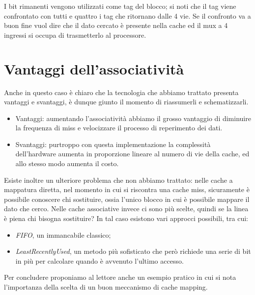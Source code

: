\documentclass[class=book, crop=false, oneside]{standalone}
\begin{document}
I bit rimanenti vengono utilizzati come tag del blocco; si noti che il tag viene confrontato con tutti e quattro i tag che ritornano dalle 4 vie.
Se il confronto va a buon fine vuol dire che il dato cercato è presente nella cache ed il mux a 4 ingressi si occupa di trasmetterlo al processore.

\section{Vantaggi dell'associatività}
Anche in questo caso è chiaro che la tecnologia che abbiamo trattato presenta vantaggi e svantaggi, è dunque giunto il momento di riassumerli e schematizzarli.
\begin{itemize}
	\item Vantaggi: aumentando l’associatività abbiamo il grosso vantaggio di diminuire la frequenza di miss e velocizzare il processo di reperimento dei dati.
	\item Svantaggi: purtroppo con questa implementazione la complessità dell'hardware aumenta in proporzione lineare al numero di vie della cache, ed allo stesso modo aumenta il costo.
\end{itemize}
Esiste inoltre un ulteriore problema che non abbiamo trattato: nelle cache a mappatura diretta, nel momento in cui si riscontra una cache miss, sicuramente è possibile conoscere chi sostituire, ossia l’unico blocco in cui è possibile mappare il dato che cerco. Nelle cache associative invece ci sono più scelte, quindi se la linea è piena chi bisogna sostituire? In tal caso esistono vari approcci possibili, tra cui:
\begin{itemize}
	\item \emph{FIFO}, un immancabile classico;
	\item \emph{LeastRecentlyUsed}, un metodo più sofisticato che però richiede una serie di bit in più per calcolare quando è avvenuto l'ultimo accesso.
\end{itemize}
Per concludere proponiamo al lettore anche un esempio pratico in cui si nota l'importanza della scelta di un buon meccanismo di cache mapping.
\end{document}
